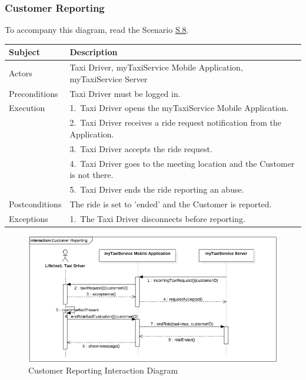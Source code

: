 \subsubsection{Customer Reporting}
			To accompany this diagram, read the Scenario \hyperref[sec:CustomerReportingScenario]{S.8}.

				\begin{table}[htpb]
					\centering
					\label{tab:CustomerReportingDiagramTable}
					\begin{tabularx}{\textwidth}{lp{9cm}}
						\hline
						\hline
							\textbf{Subject}
						& 
							\textbf{Description}\\
						\hline
							Actors	       &  Taxi Driver, myTaxiService Mobile Application, myTaxiService Server\\
						\hline
							Preconditions  &  Taxi Driver must be logged in.\\
						\hline
							Execution      &  1.~Taxi Driver opens the myTaxiService Mobile Application.\\
										   &  2.~Taxi Driver receives a ride request notification from the Application.\\
										   &  3.~Taxi Driver accepts the ride request.\\
										   &  4.~Taxi Driver goes to the meeting location and the Customer is not there.\\
										   &  5.~Taxi Driver ends the ride reporting an abuse.\\
						\hline
							Postconditions &  The ride is set to 'ended' and the Customer is reported.\\
						\hline
							Exceptions     &  1.~The Taxi Driver disconnects before reporting.\\
									
						\hline
						\hline
					\end{tabularx}
				\end{table}
				
				\begin{figure}[H]
					\centering
					\includegraphics[width=\textwidth, scale=0.5]{IMG/InteractionDiagrams/CustomerReporting.png}
					\caption{Customer Reporting Interaction Diagram}\label{sec:FigureCustomerReporting}
				\end{figure}